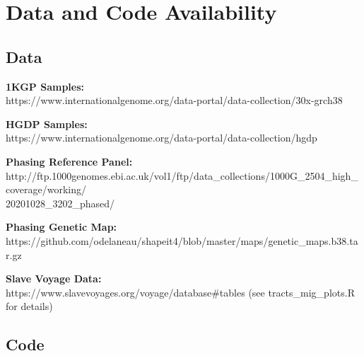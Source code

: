 \documentclass[11pt]{article}
\begin{document}

\vspace{8mm}
\section{Data and Code Availability}

\subsection{Data}

\textbf{1KGP Samples:} \\
https://www.internationalgenome.org/data-portal/data-collection/30x-grch38
\vspace{3mm}

\noindent
\textbf{HGDP Samples:} \\
https://www.internationalgenome.org/data-portal/data-collection/hgdp
\vspace{3mm}

\noindent
\textbf{Phasing Reference Panel:} \\
http://ftp.1000genomes.ebi.ac.uk/vol1/ftp/data\_collections/1000G\_2504\_high\_coverage/working/\\20201028\_3202\_phased/
\vspace{3mm}

\noindent
\textbf{Phasing Genetic Map:} \\
https://github.com/odelaneau/shapeit4/blob/master/maps/genetic\_maps.b38.tar.gz
\vspace{3mm}

\noindent
\textbf{Slave Voyage Data:} \\
https://www.slavevoyages.org/voyage/database\#tables (see tracts\_mig\_plots.R for details)


\vspace{.4cm}
\subsection{Code}
\end{document}
